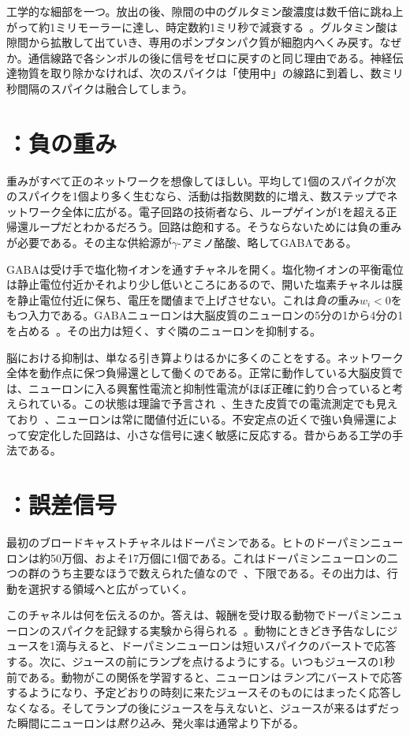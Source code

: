 工学的な細部を一つ。放出の後、隙間の中のグルタミン酸濃度は数千倍に跳ね上がって約1ミリモーラーに達し、時定数約1ミリ秒で減衰する~\cite{Clements1992}。グルタミン酸は隙間から拡散して出ていき、専用のポンプタンパク質が細胞内へくみ戻す。なぜか。通信線路で各シンボルの後に信号をゼロに戻すのと同じ理由である。神経伝達物質を取り除かなければ、次のスパイクは「使用中」の線路に到着し、数ミリ秒間隔のスパイクは融合してしまう。

\section{：負の重み}

重みがすべて正のネットワークを想像してほしい。平均して1個のスパイクが次のスパイクを1個より多く生むなら、活動は指数関数的に増え、数ステップでネットワーク全体に広がる。電子回路の技術者なら、ループゲインが1を超える正帰還ループだとわかるだろう。回路は飽和する。そうならないためには負の重みが必要である。その主な供給源が$\gamma$-アミノ酪酸、略してGABAである。

GABAは受け手で塩化物イオンを通すチャネルを開く。塩化物イオンの平衡電位は静止電位付近かそれより少し低いところにあるので、開いた塩素チャネルは膜を静止電位付近に保ち、電圧を閾値まで上げさせない。これは\emph{負の}重み$w_i<0$をもつ入力である。GABAニューロンは大脳皮質のニューロンの5分の1から4分の1を占める~\cite{Hendry1987}。その出力は短く、すぐ隣のニューロンを抑制する。

脳における抑制は、単なる引き算よりはるかに多くのことをする。ネットワーク全体を動作点に保つ負帰還として働くのである。正常に動作している大脳皮質では、ニューロンに入る興奮性電流と抑制性電流がほぼ正確に釣り合っていると考えられている。この状態は理論で予言され~\cite{vanVreeswijk1996}、生きた皮質での電流測定でも見えており~\cite{Haider2006}、ニューロンは常に閾値付近にいる。不安定点の近くで強い負帰還によって安定化した回路は、小さな信号に速く敏感に反応する。昔からある工学の手法である。

\section{：誤差信号}

最初のブロードキャストチャネルはドーパミンである。ヒトのドーパミンニューロンは約50万個、およそ17万個に1個である。これはドーパミンニューロンの二つの群のうち主要なほうで数えられた値なので~\cite{Pakkenberg1991}、下限である。その出力は、行動を選択する領域へと広がっていく。

このチャネルは何を伝えるのか。答えは、報酬を受け取る動物でドーパミンニューロンのスパイクを記録する実験から得られる~\cite{Schultz1997}。動物にときどき予告なしにジュースを1滴与えると、ドーパミンニューロンは短いスパイクのバーストで応答する。次に、ジュースの前にランプを点けるようにする。いつもジュースの1秒前である。動物がこの関係を学習すると、ニューロンは\emph{ランプ}にバーストで応答するようになり、予定どおりの時刻に来たジュースそのものにはまったく応答しなくなる。そしてランプの後にジュースを与えないと、ジュースが来るはずだった瞬間にニューロンは\emph{黙り込み}、発火率は通常より下がる。

